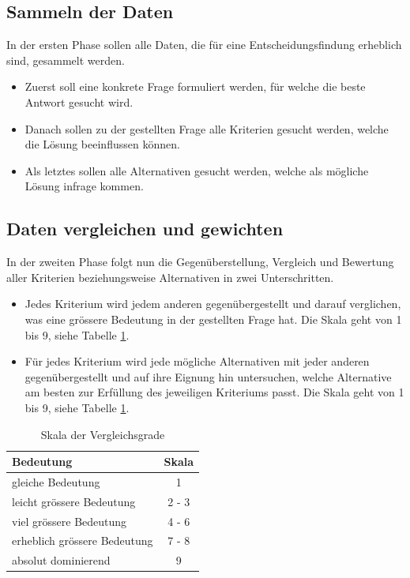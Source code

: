   \subsection{Sammeln der Daten}
  
  In der ersten Phase sollen alle Daten, die für eine Entscheidungsfindung
  erheblich sind, gesammelt werden.
  
  \begin{itemize}
    \item Zuerst soll eine konkrete Frage formuliert werden, für welche die
    beste Antwort gesucht wird.
    \item Danach sollen zu der gestellten Frage alle Kriterien  gesucht werden,
    welche die Lösung beeinflussen können.
    \item Als letztes sollen alle Alternativen gesucht werden, welche als
    mögliche Lösung infrage kommen.
  \end{itemize}
  
  \subsection{Daten vergleichen und gewichten}
  
  In der zweiten Phase folgt nun die Gegenüberstellung, Vergleich und Bewertung
  aller Kriterien beziehungsweise Alternativen in zwei Unterschritten.
  
  \begin{itemize}
    \item Jedes Kriterium wird jedem anderen gegenübergestellt und darauf
    verglichen, was eine grössere Bedeutung in der gestellten Frage hat. Die
    Skala geht von 1 bis 9, siehe Tabelle \ref{tab:vergleichsgrade}.
    \item Für jedes Kriterium wird jede mögliche Alternativen mit jeder anderen
    gegenübergestellt und auf ihre Eignung hin untersuchen, welche Alternative
    am besten zur Erfüllung des jeweiligen Kriteriums passt. Die Skala geht von
    1 bis 9, siehe Tabelle \ref{tab:vergleichsgrade}.
  \end{itemize}
  
  \begin{table}[ht]
    \sffamily 
    \begin{center}
      \begin{tabular}{lc}
        \toprule
        \textbf{Bedeutung} & \textbf{Skala}\\
        \midrule
        gleiche Bedeutung & 1\\
        leicht grössere Bedeutung & 2 - 3\\
        viel grössere Bedeutung & 4 - 6\\
        erheblich grössere Bedeutung & 7 - 8\\
        absolut dominierend & 9\\
        \bottomrule
      \end{tabular}
      \caption{Skala der Vergleichsgrade}
      \label{tab:vergleichsgrade}
    \end{center}
  \end{table}
    
